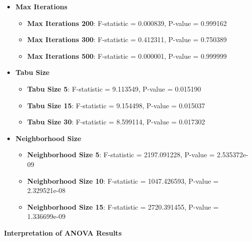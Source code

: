 \documentclass{article}
\begin{document}
    \begin{itemize}
        \item \textbf{Max Iterations}
        \begin{itemize}
            \item \textbf{Max Iterations 200}: F-statistic = 0.000839, P-value = 0.999162
            \item \textbf{Max Iterations 300}: F-statistic = 0.412311, P-value = 0.750389
            \item \textbf{Max Iterations 500}: F-statistic = 0.000001, P-value = 0.999999
        \end{itemize}
        \item \textbf{Tabu Size}
        \begin{itemize}
            \item \textbf{Tabu Size 5}: F-statistic = 9.113549, P-value = 0.015190
            \item \textbf{Tabu Size 15}: F-statistic = 9.154498, P-value = 0.015037
            \item \textbf{Tabu Size 30}: F-statistic = 8.599114, P-value = 0.017302
        \end{itemize}
        \item \textbf{Neighborhood Size}
        \begin{itemize}
            \item \textbf{Neighborhood Size 5}: F-statistic = 2197.091228, P-value = 2.535372e-09
            \item \textbf{Neighborhood Size 10}: F-statistic = 1047.426593, P-value = 2.329521e-08
            \item \textbf{Neighborhood Size 15}: F-statistic = 2720.391455, P-value = 1.336699e-09
        \end{itemize}
    \end{itemize}

    \textbf{Interpretation of ANOVA Results}
\end{document}
